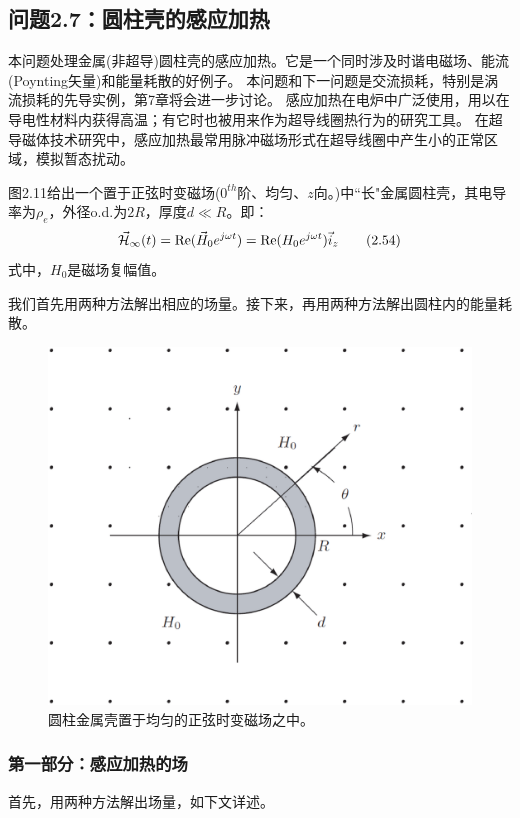 \subsection{问题2.7：圆柱壳的感应加热}
本问题处理金属(非超导)圆柱壳的感应加热。它是一个同时涉及时谐电磁场、能流(Poynting矢量)和能量耗散的好例子。
本问题和下一问题是交流损耗，特别是涡流损耗的先导实例，第7章将会进一步讨论。
感应加热在电炉中广泛使用，用以在导电性材料内获得高温；有它时也被用来作为超导线圈热行为的研究工具。
在超导磁体技术研究中，感应加热最常用脉冲磁场形式在超导线圈中产生小的正常区域，模拟暂态扰动。

图2.11给出一个置于正弦时变磁场($0^{th}$阶、均匀、$z$向。)中``长"金属圆柱壳，其电导率为$\rho_e$，外径o.d.为$2R$，厚度$d\ll R$。即：
\begin{equation*}
\vec{\CMcal{H}}_\infty(t)=\mathrm{Re}(\vec{H}_0 e^{j\omega t})=\mathrm{Re}(H_0 e^{j\omega t})\vec{i}_z \tag{2.54}
\end{equation*}
式中，$H_0$是磁场复幅值。

我们首先用两种方法解出相应的场量。接下来，再用两种方法解出圆柱内的能量耗散。

\begin{figure}[htbp]
  \centering
 \includegraphics[scale=0.4]{chpt2/figs/fig2.11.eps}
  \caption{圆柱金属壳置于均匀的正弦时变磁场之中。}
\end{figure}

\subsubsection*{第一部分：感应加热的场}
首先，用两种方法解出场量，如下文详述。

